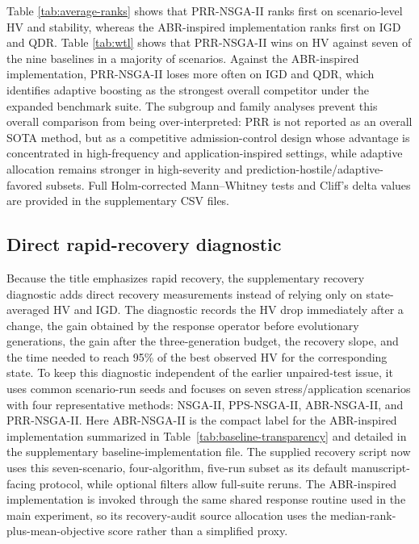 \documentclass[1p,times]{elsarticle}
\begin{document}
Table \ref{tab:average-ranks} shows that PRR-NSGA-II ranks first on scenario-level HV and stability, whereas the ABR-inspired implementation ranks first on IGD and QDR. Table \ref{tab:wtl} shows that PRR-NSGA-II wins on HV against seven of the nine baselines in a majority of scenarios. Against the ABR-inspired implementation, PRR-NSGA-II loses more often on IGD and QDR, which identifies adaptive boosting as the strongest overall competitor under the expanded benchmark suite. The subgroup and family analyses prevent this overall comparison from being over-interpreted: PRR is not reported as an overall SOTA method, but as a competitive admission-control design whose advantage is concentrated in high-frequency and application-inspired settings, while adaptive allocation remains stronger in high-severity and prediction-hostile/adaptive-favored subsets. Full Holm-corrected Mann--Whitney tests and Cliff's delta values are provided in the supplementary CSV files.

\subsection{Direct rapid-recovery diagnostic}
Because the title emphasizes rapid recovery, the supplementary recovery diagnostic adds direct recovery measurements instead of relying only on state-averaged HV and IGD. The diagnostic records the HV drop immediately after a change, the gain obtained by the response operator before evolutionary generations, the gain after the three-generation budget, the recovery slope, and the time needed to reach 95\% of the best observed HV for the corresponding state. To keep this diagnostic independent of the earlier unpaired-test issue, it uses common scenario-run seeds and focuses on seven stress/application scenarios with four representative methods: NSGA-II, PPS-NSGA-II, ABR-NSGA-II, and PRR-NSGA-II. Here ABR-NSGA-II is the compact label for the ABR-inspired implementation summarized in Table~\ref{tab:baseline-transparency} and detailed in the supplementary baseline-implementation file. The supplied recovery script now uses this seven-scenario, four-algorithm, five-run subset as its default manuscript-facing protocol, while optional filters allow full-suite reruns. The ABR-inspired implementation is invoked through the same shared response routine used in the main experiment, so its recovery-audit source allocation uses the median-rank-plus-mean-objective score rather than a simplified proxy.
\end{document}
